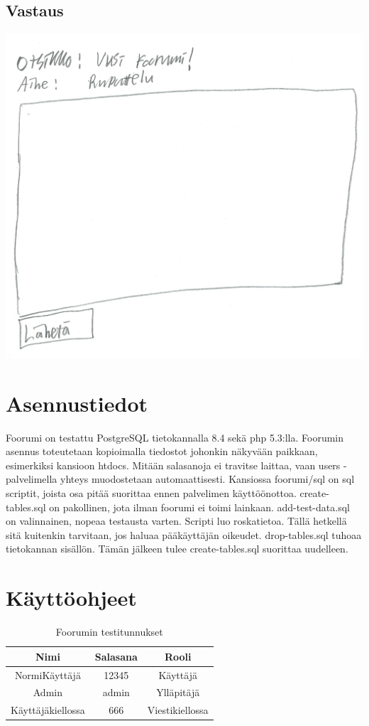 \documentclass[a4paper, 12pt, finnish]{article}
\begin{document}
\subsection{Vastaus}
\includegraphics[width=\textwidth,height=\textheight,keepaspectratio]{vastaus.png}

\newpage

\section{Asennustiedot}
Foorumi on testattu PostgreSQL tietokannalla 8.4 sekä php 5.3:lla.
Foorumin asennus toteutetaan kopioimalla tiedostot johonkin näkyvään paikkaan, esimerkiksi kansioon htdocs.
Mitään salasanoja ei travitse laittaa, vaan users -palvelimella yhteys muodostetaan automaattisesti.
Kansiossa foorumi/sql on sql scriptit, joista osa pitää suorittaa ennen palvelimen käyttöönottoa.
create-tables.sql on pakollinen, jota ilman foorumi ei toimi lainkaan.
add-test-data.sql on valinnainen, nopeaa testausta varten.
Scripti luo roskatietoa.
Tällä hetkellä sitä kuitenkin tarvitaan, jos haluaa pääkäyttäjän oikeudet.
drop-tables.sql tuhoaa tietokannan sisällön. Tämän jälkeen tulee create-tables.sql suorittaa uudelleen.

\newpage

\section{Käyttöohjeet}
\begin{table}[ht]
\caption{Foorumin testitunnukset}
\centering
\begin{tabular}{c|c|c}
\hline
Nimi & Salasana & Rooli \\ [0.5ex]
\hline
NormiKäyttäjä&12345&Käyttäjä \\
Admin&admin&Ylläpitäjä \\
Käyttäjäkiellossa&666&Viestikiellossa \\ [1ex]
\hline
\end{tabular}
\end{table}
\end{document}

